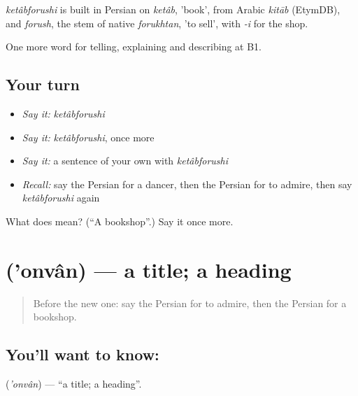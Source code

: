 \begin{cousinweb}
\emph{ketâbforushi} is built in Persian on \emph{ketâb}, 'book', from Arabic \emph{kitāb} (EtymDB), and \emph{forush}, the stem of native \emph{forukhtan}, 'to sell', with \emph{-i} for the shop.
\end{cousinweb}

\begin{grammarlens}[title={What you've built}]
One more word for telling, explaining and describing at B1.
\end{grammarlens}

\subsection*{Your turn}
\begin{itemize}
\raggedright
  \item \emph{Say it:} \emph{ketâbforushi}
  \item \emph{Say it:} \emph{ketâbforushi}, once more
  \item \emph{Say it:} a sentence of your own with \emph{ketâbforushi}
  \item \emph{Recall:} say the Persian for a dancer, then the Persian for to admire, then say \emph{ketâbforushi} again
\end{itemize}

\begin{tcolorbox}[breakable,colback=teal!4,colframe=teal!35!black,title={Before you move on}]
What does  mean? (\textquotedblleft{}A bookshop\textquotedblright{}.) Say it once more.
\end{tcolorbox}
\section[\texorpdfstring{\fa{عنوان} ('onvân)}{عنوان ('onvân)}]{ ('onvân) — a title; a heading}

\label{lesson:FA-C528-onvan}



\begin{quote}
Before the new one: say the Persian for to admire, then the Persian for a bookshop.
\end{quote}

\subsection*{You'll want to know: }
\textbf{} (\emph{'onvân}) — \textquotedblleft{}a title; a heading\textquotedblright{}.

